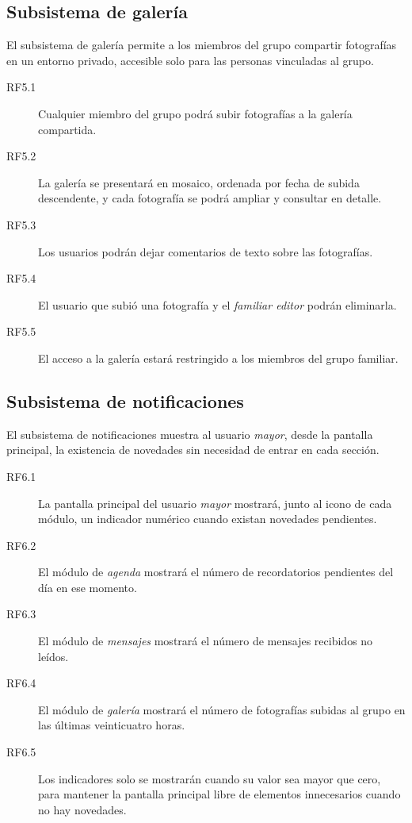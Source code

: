 \subsection{Subsistema de galería\label{SUB:REQ_GALERIA}}

El subsistema de galería permite a los miembros del grupo compartir
fotografías en un entorno privado, accesible solo para las personas
vinculadas al grupo.

\begin{description}
  \item[RF5.1] Cualquier miembro del grupo podrá subir fotografías a la
  galería compartida.
  \item[RF5.2] La galería se presentará en mosaico, ordenada por fecha de
  subida descendente, y cada fotografía se podrá ampliar y consultar en
  detalle.
  \item[RF5.3] Los usuarios podrán dejar comentarios de texto sobre las
  fotografías.
  \item[RF5.4] El usuario que subió una fotografía y el \emph{familiar
  editor} podrán eliminarla.
  \item[RF5.5] El acceso a la galería estará restringido a los miembros del
  grupo familiar.
\end{description}

\subsection{Subsistema de notificaciones\label{SUB:REQ_NOTIFICACIONES}}

El subsistema de notificaciones muestra al usuario \emph{mayor}, desde la
pantalla principal, la existencia de novedades sin necesidad de entrar en
cada sección.

\begin{description}
  \item[RF6.1] La pantalla principal del usuario \emph{mayor} mostrará,
  junto al icono de cada módulo, un indicador numérico cuando existan
  novedades pendientes.
  \item[RF6.2] El módulo de \emph{agenda} mostrará el número de
  recordatorios pendientes del día en ese momento.
  \item[RF6.3] El módulo de \emph{mensajes} mostrará el número de mensajes
  recibidos no leídos.
  \item[RF6.4] El módulo de \emph{galería} mostrará el número de fotografías
  subidas al grupo en las últimas veinticuatro horas.
  \item[RF6.5] Los indicadores solo se mostrarán cuando su valor sea mayor
  que cero, para mantener la pantalla principal libre de elementos
  innecesarios cuando no hay novedades.
\end{description}

